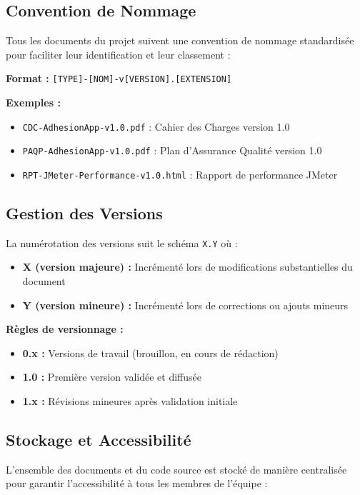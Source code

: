 \documentclass[12pt,a4paper]{report}
\begin{document}
\subsection{Convention de Nommage}

Tous les documents du projet suivent une convention de nommage standardisée pour faciliter leur identification et leur classement :

\textbf{Format :} \texttt{[TYPE]-[NOM]-v[VERSION].[EXTENSION]}

\textbf{Exemples :}
\begin{itemize}
    \item \texttt{CDC-AdhesionApp-v1.0.pdf} : Cahier des Charges version 1.0
    \item \texttt{PAQP-AdhesionApp-v1.0.pdf} : Plan d'Assurance Qualité version 1.0
    \item \texttt{RPT-JMeter-Performance-v1.0.html} : Rapport de performance JMeter
\end{itemize}

\subsection{Gestion des Versions}

La numérotation des versions suit le schéma \texttt{X.Y} où :
\begin{itemize}
    \item \textbf{X (version majeure) :} Incrémenté lors de modifications substantielles du document
    \item \textbf{Y (version mineure) :} Incrémenté lors de corrections ou ajouts mineurs
\end{itemize}

\textbf{Règles de versionnage :}
\begin{itemize}
    \item \textbf{0.x :} Versions de travail (brouillon, en cours de rédaction)
    \item \textbf{1.0 :} Première version validée et diffusée
    \item \textbf{1.x :} Révisions mineures après validation initiale
\end{itemize}

\subsection{Stockage et Accessibilité}

L'ensemble des documents et du code source est stocké de manière centralisée pour garantir l'accessibilité à tous les membres de l'équipe :
\end{document}
